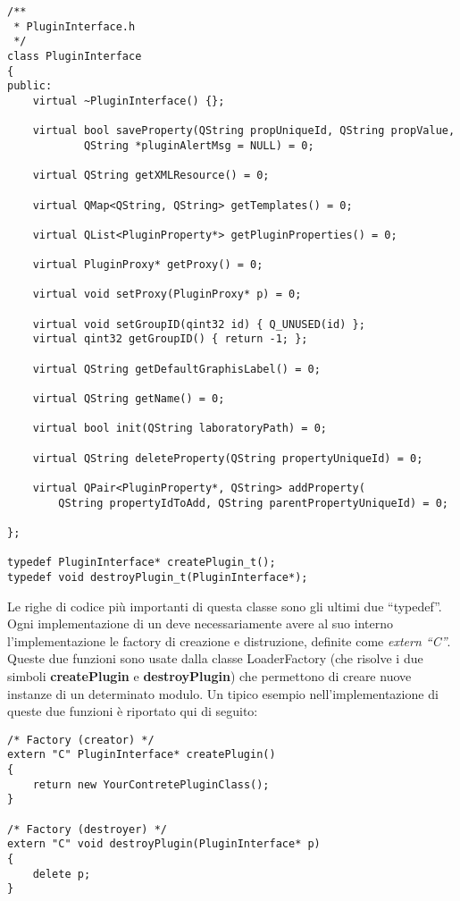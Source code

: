\begin{lstlisting}
/**
 * PluginInterface.h
 */
class PluginInterface
{
public:
	virtual ~PluginInterface() {};

	virtual bool saveProperty(QString propUniqueId, QString propValue,
			QString *pluginAlertMsg = NULL) = 0;

	virtual QString getXMLResource() = 0;

	virtual QMap<QString, QString> getTemplates() = 0;
	
	virtual QList<PluginProperty*> getPluginProperties() = 0;

	virtual PluginProxy* getProxy() = 0;

	virtual void setProxy(PluginProxy* p) = 0;

	virtual void setGroupID(qint32 id) { Q_UNUSED(id) };
	virtual qint32 getGroupID() { return -1; };

	virtual QString getDefaultGraphisLabel() = 0;

	virtual QString getName() = 0;

	virtual bool init(QString laboratoryPath) = 0;
	
	virtual QString deleteProperty(QString propertyUniqueId) = 0;
	
	virtual QPair<PluginProperty*, QString> addProperty(
		QString propertyIdToAdd, QString parentPropertyUniqueId) = 0;
	
};

typedef PluginInterface* createPlugin_t();
typedef void destroyPlugin_t(PluginInterface*);
\end{lstlisting}
Le righe di codice più importanti di questa classe sono gli ultimi due ``typedef''. Ogni implementazione di un \plugin{} deve necessariamente avere al suo interno l'implementazione le factory di creazione e distruzione, definite come \emph{extern ``C''}. Queste due funzioni sono usate dalla classe LoaderFactory (che risolve i due simboli \textbf{createPlugin} e \textbf{destroyPlugin}) che permettono di creare nuove instanze di un determinato modulo. Un tipico esempio nell'implementazione di queste due funzioni è riportato qui di seguito:

\begin{lstlisting}
/* Factory (creator) */
extern "C" PluginInterface* createPlugin()
{
	return new YourContretePluginClass();
}

/* Factory (destroyer) */
extern "C" void destroyPlugin(PluginInterface* p)
{
	delete p;
}
\end{lstlisting}

